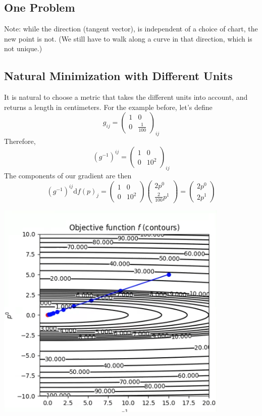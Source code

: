 \documentclass[10pt]{article}
\newcommand{\dd}{\text{d}}
\begin{document}
\subsection*{One Problem}
Note: while the direction (tangent vector), is independent of a choice of chart, the new point is not.  (We still have to walk along a curve in that direction, which is not unique.)

\subsection*{Natural Minimization with Different Units}
It is natural to choose a metric that takes the different units into account, and returns a length in centimeters.  For the example before, let's define
\[g_{ij} = \begin{pmatrix} 1 & 0 \\ 0 & \frac{1}{100} \end{pmatrix}_{ij}\]
Therefore,
\[(g^{-1})^{ij} = \begin{pmatrix} 1 & 0 \\ 0 & 10^2 \end{pmatrix}_{ij}\]
The components of our gradient are then
\[(g^{-1})^{ij} \dd f(p)_j = \begin{pmatrix} 1 & 0 \\ 0 & 10^2 \end{pmatrix} \begin{pmatrix}
2 p^0 \\ \frac{2}{100} p^1 \end{pmatrix} = \begin{pmatrix} 2 p^0 \\ 2 p^1 \end{pmatrix}\]
\begin{center} 
	\includegraphics*[scale=0.8]{W8_5.png} 
\end{center}
\end{document}
